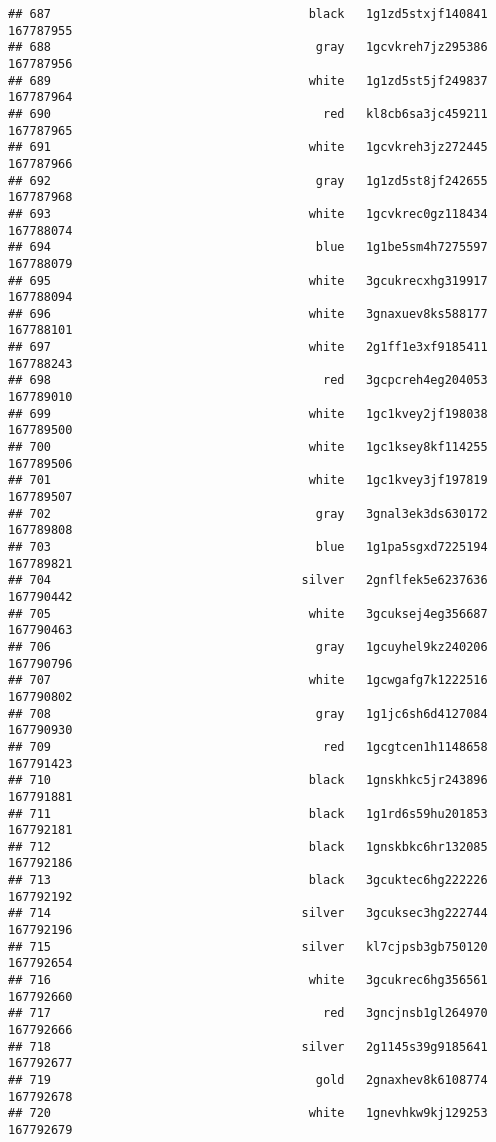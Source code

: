 \documentclass[
]{article}
\begin{document}
\begin{verbatim}
## 687                                    black   1g1zd5stxjf140841 167787955
## 688                                     gray   1gcvkreh7jz295386 167787956
## 689                                    white   1g1zd5st5jf249837 167787964
## 690                                      red   kl8cb6sa3jc459211 167787965
## 691                                    white   1gcvkreh3jz272445 167787966
## 692                                     gray   1g1zd5st8jf242655 167787968
## 693                                    white   1gcvkrec0gz118434 167788074
## 694                                     blue   1g1be5sm4h7275597 167788079
## 695                                    white   3gcukrecxhg319917 167788094
## 696                                    white   3gnaxuev8ks588177 167788101
## 697                                    white   2g1ff1e3xf9185411 167788243
## 698                                      red   3gcpcreh4eg204053 167789010
## 699                                    white   1gc1kvey2jf198038 167789500
## 700                                    white   1gc1ksey8kf114255 167789506
## 701                                    white   1gc1kvey3jf197819 167789507
## 702                                     gray   3gnal3ek3ds630172 167789808
## 703                                     blue   1g1pa5sgxd7225194 167789821
## 704                                   silver   2gnflfek5e6237636 167790442
## 705                                    white   3gcuksej4eg356687 167790463
## 706                                     gray   1gcuyhel9kz240206 167790796
## 707                                    white   1gcwgafg7k1222516 167790802
## 708                                     gray   1g1jc6sh6d4127084 167790930
## 709                                      red   1gcgtcen1h1148658 167791423
## 710                                    black   1gnskhkc5jr243896 167791881
## 711                                    black   1g1rd6s59hu201853 167792181
## 712                                    black   1gnskbkc6hr132085 167792186
## 713                                    black   3gcuktec6hg222226 167792192
## 714                                   silver   3gcuksec3hg222744 167792196
## 715                                   silver   kl7cjpsb3gb750120 167792654
## 716                                    white   3gcukrec6hg356561 167792660
## 717                                      red   3gncjnsb1gl264970 167792666
## 718                                   silver   2g1145s39g9185641 167792677
## 719                                     gold   2gnaxhev8k6108774 167792678
## 720                                    white   1gnevhkw9kj129253 167792679

\end{verbatim}
\end{document}
